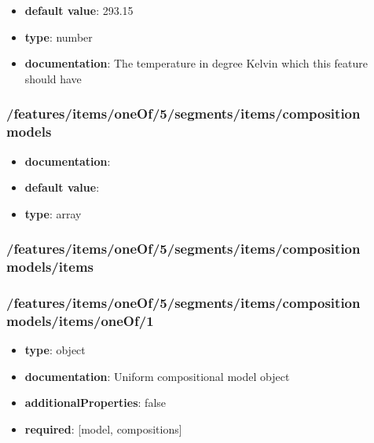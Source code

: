 \begin{itemize}\item {\bf default value}: 293.15
\item {\bf type}: number
\item {\bf documentation}: The temperature in degree Kelvin which this feature should have
\end{itemize}\subsubsection{/features/items/oneOf/5/segments/items/composition models}
\begin{itemize}\item {\bf documentation}: 
\item {\bf default value}: 
\item {\bf type}: array
\end{itemize}\subsubsection{/features/items/oneOf/5/segments/items/composition models/items}

\subsubsection{/features/items/oneOf/5/segments/items/composition models/items/oneOf/1}
\begin{itemize}\item {\bf type}: object
\item {\bf documentation}: Uniform compositional model object
\item {\bf additionalProperties}: false
\item {\bf required}: [model, compositions]\end{itemize}
